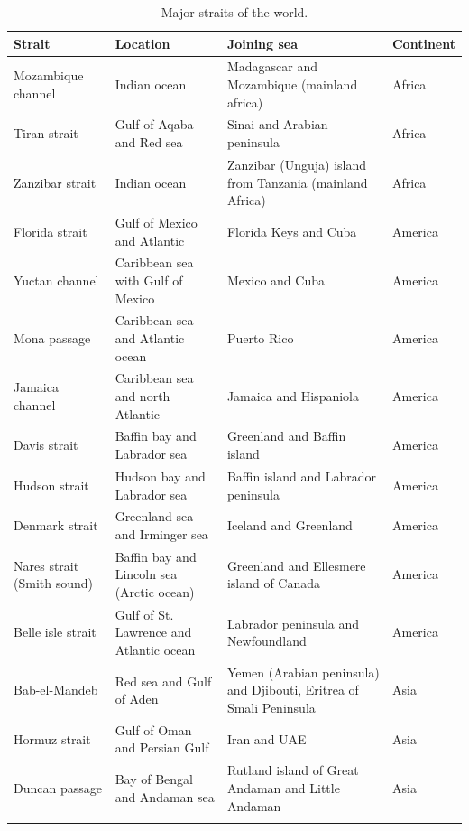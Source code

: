 \documentclass[
  openany]{book}
\begin{document}
\begin{longtable}[t]{>{\raggedright\arraybackslash}p{8em}>{\raggedright\arraybackslash}p{12em}>{\raggedright\arraybackslash}p{12em}>{\raggedright\arraybackslash}p{5em}}
\caption{\label{tab:world-straits}Major straits of the world.}\\
\toprule
Strait & Location & Joining sea & Continent\\
\midrule
\rowcolor{gray!6}  Mozambique channel & Indian ocean & Madagascar and Mozambique (mainland africa) & Africa\\
Tiran strait & Gulf of Aqaba and Red sea & Sinai and Arabian peninsula & Africa\\
\rowcolor{gray!6}  Zanzibar strait & Indian ocean & Zanzibar (Unguja) island from Tanzania (mainland Africa) & Africa\\
Florida strait & Gulf of Mexico and Atlantic & Florida Keys and Cuba & America\\
\rowcolor{gray!6}  Yuctan channel & Caribbean sea with Gulf of Mexico & Mexico and Cuba & America\\
\addlinespace
Mona passage & Caribbean sea and Atlantic ocean & Puerto Rico & America\\
\rowcolor{gray!6}  Jamaica channel & Caribbean sea and north Atlantic & Jamaica and Hispaniola & America\\
Davis strait & Baffin bay and Labrador sea & Greenland and Baffin island & America\\
\rowcolor{gray!6}  Hudson strait & Hudson bay and Labrador sea & Baffin island and Labrador peninsula & America\\
Denmark strait & Greenland sea and Irminger sea & Iceland and Greenland & America\\
\addlinespace
\rowcolor{gray!6}  Nares strait (Smith sound) & Baffin bay and Lincoln sea (Arctic ocean) & Greenland and Ellesmere island of Canada & America\\
Belle isle strait & Gulf of St. Lawrence and Atlantic ocean & Labrador peninsula and Newfoundland & America\\
\rowcolor{gray!6}  Bab-el-Mandeb & Red sea and Gulf of Aden & Yemen (Arabian peninsula) and Djibouti, Eritrea of Smali Peninsula & Asia\\
Hormuz strait & Gulf of Oman and Persian Gulf & Iran and UAE & Asia\\
\rowcolor{gray!6}  Duncan passage & Bay of Bengal and Andaman sea & Rutland island of Great Andaman and Little Andaman & Asia\\
\addlinespace

\end{longtable}
\end{document}
